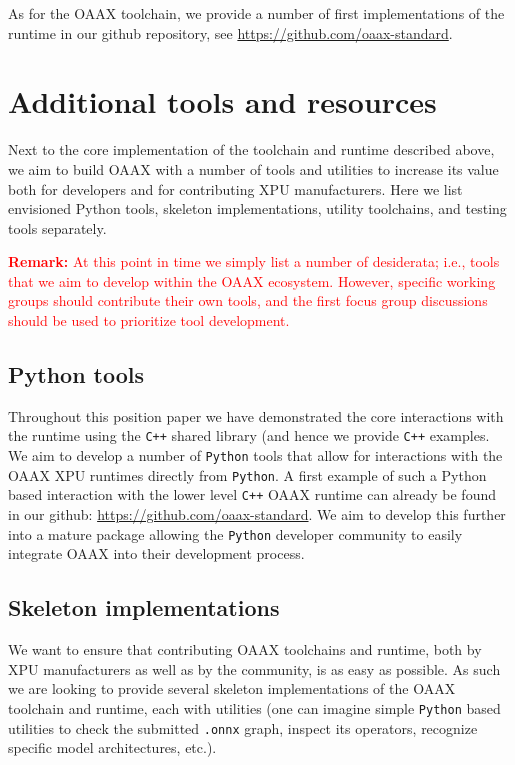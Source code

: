 \documentclass{article}
\newcommand{\remark}[1]{\textcolor{red}{\textbf{\newline Remark:} \newline #1 \newline}}
\newcommand{\oaaxgit}{\href{https://github.com/oaax-standard}{https://github.com/oaax-standard}}
\begin{document}
As for the OAAX toolchain, we provide a number of first implementations of the runtime in our github repository, see \oaaxgit.

\section{Additional tools and resources}

Next to the core implementation of the toolchain and runtime described above, we aim to build OAAX with a  number of tools and utilities to increase its value both for developers and for contributing XPU manufacturers. Here we list envisioned Python tools, skeleton implementations, utility toolchains, and testing tools separately.

\remark{At this point in time we simply list a number of desiderata; i.e., tools that we aim to develop within the OAAX ecosystem. However, specific working groups should contribute their own tools, and the first focus group discussions should be used to prioritize tool development.}

\subsection{Python tools}

Throughout this position paper we have demonstrated the core interactions with the runtime using the \texttt{C++} shared library (and hence we provide \texttt{C++} examples. We aim to develop a number of \texttt{Python} tools that allow for interactions with the OAAX XPU runtimes directly from \texttt{Python}. A first example of such a Python based interaction with the lower level \texttt{C++} OAAX runtime can already be found in our github: \oaaxgit. We aim to develop this further into a mature package allowing the \texttt{Python} developer community to easily integrate OAAX into their development process.

\subsection{Skeleton implementations}

We want to ensure that contributing OAAX toolchains and runtime, both by XPU manufacturers as well as by the community, is as easy as possible. As such we are looking to provide several skeleton implementations of the OAAX toolchain and runtime, each with utilities (one can imagine simple \texttt{Python} based utilities to check the submitted \texttt{.onnx} graph, inspect its operators, recognize specific model architectures, etc.).
\end{document}
